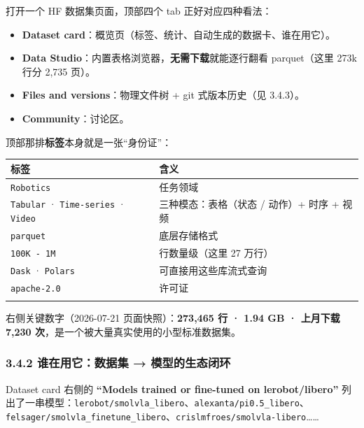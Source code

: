 \documentclass[
  chinese,
]{ctexart}
\providecommand{\tightlist}{%
  \setlength{\itemsep}{0pt}\setlength{\parskip}{0pt}}
\begin{document}
打开一个 HF 数据集页面，顶部四个 tab 正好对应四种看法：

\begin{itemize}
\tightlist
\item
  \textbf{Dataset
  card}：概览页（标签、统计、自动生成的数据卡、谁在用它）。
\item
  \textbf{Data Studio}：内置表格浏览器，\textbf{无需下载}就能逐行翻看
  parquet（这里 273k 行分 2,735 页）。
\item
  \textbf{Files and versions}：物理文件树 + git 式版本历史（见 3.4.3）。
\item
  \textbf{Community}：讨论区。
\end{itemize}

顶部那排\textbf{标签}本身就是一张``身份证''：

\begin{center}
\begin{tabular}{@{}>{\raggedright\arraybackslash}p{} >{\raggedright\arraybackslash}p{}@{}}
\toprule\noalign{}
标签 & 含义 \\
\midrule\noalign{}
\texttt{Robotics} & 任务领域 \\
\texttt{Tabular} · \texttt{Time-series} · \texttt{Video} & 三种模态：表格（状态 / 动作）+ 时序 + 视频 \\
\texttt{parquet} & 底层存储格式 \\
\texttt{100K\ -\ 1M} & 行数量级（这里 27 万行） \\
\texttt{Dask} · \texttt{Polars} & 可直接用这些库流式查询 \\
\texttt{apache-2.0} & 许可证 \\
\bottomrule\noalign{}
\end{tabular}
\end{center}

右侧关键数字（2026-07-21 页面快照）：\textbf{273,465 行 · 1.94 GB ·
上月下载 7,230 次}，是一个被大量真实使用的小型标准数据集。

\subsubsection{3.4.2 谁在用它：数据集 →
模型的生态闭环}\label{ux8c01ux5728ux7528ux5b83ux6570ux636eux96c6-ux6a21ux578bux7684ux751fux6001ux95edux73af}

Dataset card 右侧的 \textbf{``Models trained or fine-tuned on
lerobot/libero''}
列出了一串模型：\texttt{lerobot/smolvla\_libero}、\texttt{alexanta/pi0.5\_libero}、\texttt{felsager/smolvla\_finetune\_libero}、\texttt{crislmfroes/smolvla-libero}\ldots\ldots{}
\end{document}
